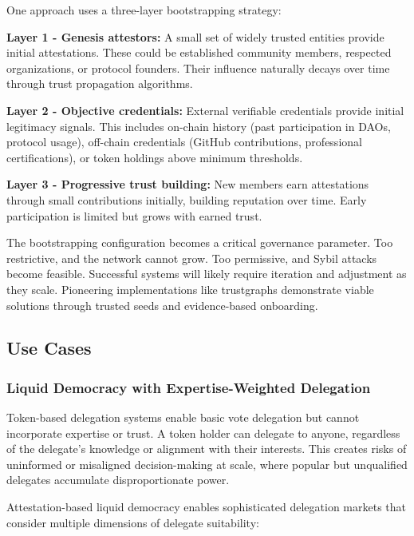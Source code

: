 One approach uses a three-layer bootstrapping strategy:

\textbf{Layer 1 - Genesis attestors:} A small set of widely trusted entities provide initial attestations. These could be established community members, respected organizations, or protocol founders. Their influence naturally decays over time through trust propagation algorithms.

\textbf{Layer 2 - Objective credentials:} External verifiable credentials provide initial legitimacy signals. This includes on-chain history (past participation in DAOs, protocol usage), off-chain credentials (GitHub contributions, professional certifications), or token holdings above minimum thresholds.

\textbf{Layer 3 - Progressive trust building:} New members earn attestations through small contributions initially, building reputation over time. Early participation is limited but grows with earned trust.

The bootstrapping configuration becomes a critical governance parameter. Too restrictive, and the network cannot grow. Too permissive, and Sybil attacks become feasible. Successful systems will likely require iteration and adjustment as they scale. Pioneering implementations like trustgraphs demonstrate viable solutions through trusted seeds and evidence-based onboarding.

\subsection{Use Cases}

\subsubsection{Liquid Democracy with Expertise-Weighted Delegation}

Token-based delegation systems enable basic vote delegation but cannot incorporate expertise or trust. A token holder can delegate to anyone, regardless of the delegate's knowledge or alignment with their interests. This creates risks of uninformed or misaligned decision-making at scale, where popular but unqualified delegates accumulate disproportionate power.

Attestation-based liquid democracy enables sophisticated delegation markets that consider multiple dimensions of delegate suitability:

